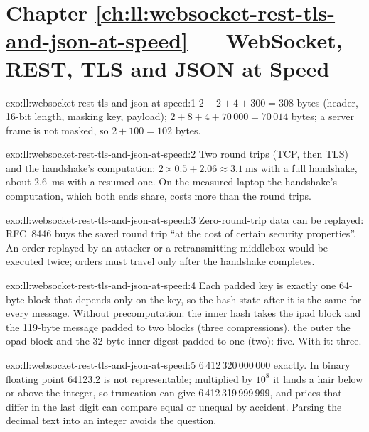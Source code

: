 \section*{Chapter \ref{ch:ll:websocket-rest-tls-and-json-at-speed} --- WebSocket, REST, TLS and JSON at Speed}

\begin{solution}{exo:ll:websocket-rest-tls-and-json-at-speed:1}
$2 + 2 + 4 + 300 = 308$ bytes (header, 16-bit length, masking key, payload); $2 + 8 + 4 + 70\,000 = 70\,014$ bytes; a server
frame is not masked, so $2 + 100 = 102$ bytes.
\end{solution}

\begin{solution}{exo:ll:websocket-rest-tls-and-json-at-speed:2}
Two round trips (TCP, then TLS) and the handshake's computation: $2 \times 0.5 + 2.06 \approx \qty{3.1}{\milli\second}$ with a
full handshake, about \qty{2.6}{\milli\second} with a resumed one. On the measured laptop the handshake's computation, which
both ends share, costs more than the round trips.
\end{solution}

\begin{solution}{exo:ll:websocket-rest-tls-and-json-at-speed:3}
Zero-round-trip data can be replayed: RFC~8446 buys the saved round trip ``at the cost of certain security properties''. An
order replayed by an attacker or a retransmitting middlebox would be executed twice; orders must travel only after the
handshake completes.
\end{solution}

\begin{solution}{exo:ll:websocket-rest-tls-and-json-at-speed:4}
Each padded key is exactly one 64-byte block that depends only on the key, so the hash state after it is the same for every
message. Without precomputation: the inner hash takes the ipad block and the 119-byte message padded to two blocks (three
compressions), the outer the opad block and the 32-byte inner digest padded to one (two): five. With it: three.
\end{solution}

\begin{solution}{exo:ll:websocket-rest-tls-and-json-at-speed:5}
6\,412\,320\,000\,000 exactly. In binary floating point 64123.2 is not representable; multiplied by $10^8$ it lands a hair
below or above the integer, so truncation can give 6\,412\,319\,999\,999, and prices that differ in the last digit can compare
equal or unequal by accident. Parsing the decimal text into an integer avoids the question.
\end{solution}

